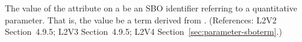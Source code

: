 The value of the  attribute on a \Parameter {} be an SBO
identifier referring to a quantitative parameter.  That is, the value 
be a term derived from \sboparameter.  (References: L2V2 Section~4.9.5; L2V3
Section~4.9.5; L2V4 Section~\ref{sec:parameter-sboterm}.)
